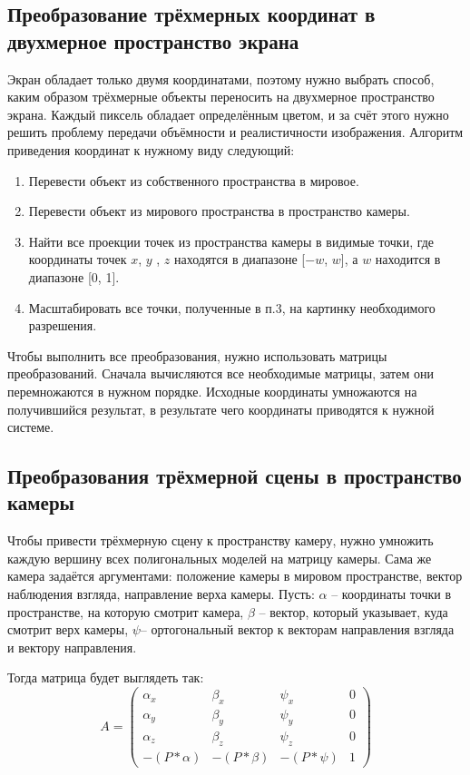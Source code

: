\subsection{Преобразование трёхмерных координат в двухмерное пространство экрана}
Экран обладает только двумя координатами, поэтому нужно выбрать способ, каким образом трёхмерные объекты переносить на двухмерное пространство экрана. 
Каждый пиксель обладает определённым цветом, и за счёт этого нужно решить проблему передачи объёмности и реалистичности изображения.
Алгоритм приведения координат к нужному виду следующий:
\begin{enumerate}
	\item Перевести объект из собственного пространства в мировое.
	\item Перевести объект из мирового пространства в пространство камеры.
	\item Найти все проекции точек из пространства камеры в видимые точки, где координаты точек $ x $, $ y $ , $ z$ находятся в диапазоне [$-w$, $w$], а $w$ находится в диапазоне [0, 1].
	\item Масштабировать все точки, полученные в п.3, на картинку необходимого разрешения.
\end{enumerate}

Чтобы выполнить все преобразования, нужно использовать матрицы преобразований. 
Сначала вычисляются все необходимые матрицы, затем они перемножаются в нужном порядке. 
Исходные координаты умножаются на получившийся результат, в результате чего координаты приводятся к нужной системе.

\subsection{Преобразования трёхмерной сцены в пространство камеры}
Чтобы привести трёхмерную сцену к пространству камеру, нужно умножить каждую вершину всех полигональных моделей на матрицу камеры. 
Сама же камера задаётся аргументами: положение камеры в мировом пространстве, вектор наблюдения взгляда, направление верха камеры.
Пусть:
$\alpha$ – координаты точки в пространстве, на которую смотрит камера, 
$\beta$ – вектор, который указывает, куда смотрит верх камеры,
$\psi$– ортогональный вектор к векторам направления взгляда и вектору направления.

Тогда матрица будет выглядеть так:
\begin{equation*}
A = \left(
\begin{array}{cccc}
\alpha_x & \beta_x & \psi_x & 0\\
\alpha_y & \beta_y & \psi_y & 0 \\
\alpha_z & \beta_z & \psi_z & 0 \\
-(P*\alpha) & -(P*\beta) &-(P*\psi) & 1
\end{array}
\right)
\end{equation*}

